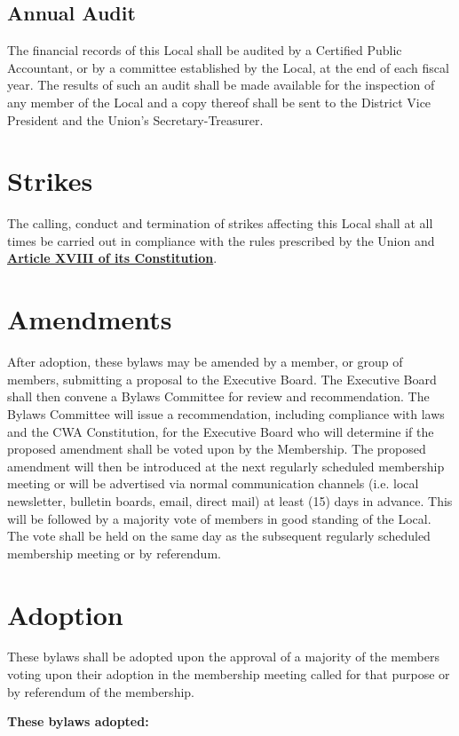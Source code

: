 \documentclass[11pt]{article}
\let\oldhref\href
\renewcommand{\href}[2]{\oldhref{#1}{\bfseries#2}}
\newcommand{\article}[1]{\vspace{.75cm}\section{#1}}
\newcommand{\articlesection}[1]{\vspace{.25cm}\subsection{#1}}
\begin{document}
\articlesection{Annual Audit}
The financial records of this Local shall be audited by a Certified Public Accountant, or by a committee established by the Local, at the end of each fiscal year. The results of such an audit shall be made available for the inspection of any member of the Local and a copy thereof shall be sent to the District Vice President and the Union’s Secretary-Treasurer.

\article{Strikes}
The calling, conduct and termination of strikes affecting this Local shall at all times be carried out in compliance with the rules prescribed by the Union and \href{https://cwa-union.org/for-locals/cwa-constitution\#A18}{Article XVIII of its Constitution}.

\article{Amendments}\label{amendments}
After adoption, these bylaws may be amended by a member, or group of members, submitting a proposal to the Executive Board. The Executive Board shall then convene a Bylaws Committee for review and recommendation. The Bylaws Committee will issue a recommendation, including compliance with laws and the CWA Constitution, for the Executive Board who will determine if the proposed amendment shall be voted upon by the Membership. The proposed amendment will then be introduced at the next regularly scheduled membership meeting or will be advertised via normal communication channels (i.e. local newsletter, bulletin boards, email, direct mail) at least (15) days in advance. This will be followed by a majority vote of members in good standing of the Local. The vote shall be held on the same day as the subsequent regularly scheduled membership meeting or by referendum.

\article{Adoption}
These bylaws shall be adopted upon the approval of a majority of the members voting upon their adoption in the membership meeting called for that purpose or by referendum of the membership.

\vspace{1cm}
\large{\textbf{These bylaws adopted:}} %
\end{document}
